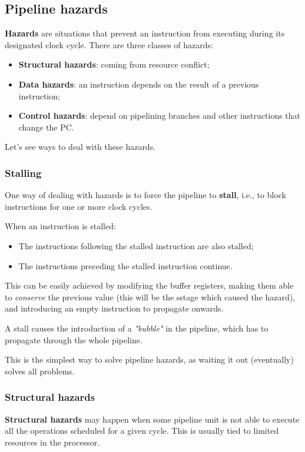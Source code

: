 \documentclass[a4paper,11pt]{article}
\begin{document}
\subsection{Pipeline hazards}

\textbf{Hazards} are situations that prevent an instruction from executing during its designated clock cycle.
There are three classes of hazards:
\begin{itemize}
	\item \textbf{Structural hazards}: coming from resource conflict;
	\item \textbf{Data hazards}: an instruction depends on the result of a previous instruction;
	\item \textbf{Control hazards}: depend on pipelining branches and other instructions that change the PC.
\end{itemize}

Let's see ways to deal with these hazards.

\subsubsection{Stalling}

One way of dealing with hazards is to force the pipeline to \textbf{stall}, i.e., to block instructions for one or more clock cycles.

When an instruction is stalled:
\begin{itemize}
	\item The instructions following the stalled instruction are also stalled;
	\item The instructions preceding the stalled instruction continue.
\end{itemize}
This can be easily achieved by modifying the buffer registers, making them able to \textit{conserve} the previous value (this will be the sstage which caused the hazard), and introducing an empty instruction to propagate onwards.

A stall causes the introduction of a \textit{"bubble"} in the pipeline, which has to propagate through the whole pipeline.

This is the simplest way to solve pipeline hazards, as waiting it out (eventually) solves all problems.

\subsubsection{Structural hazards}

\textbf{Structural hazards} may happen when some pipeline unit is not able to execute all the operations scheduled for a given cycle.
This is usually tied to limited resources in the processor.
\end{document}
